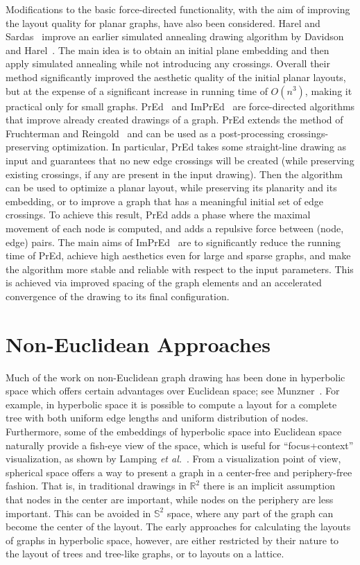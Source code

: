 \documentclass[notitlepage,letter,11pt]{article}
\begin{document}
Modifications to the basic force-directed functionality, with the aim of improving the layout quality for planar graphs, have also been considered. Harel and Sardas~\cite{harel98algorithm} improve an earlier simulated annealing drawing algorithm by Davidson and Harel~\cite{dh-dgnus-96}. The main idea is to obtain an initial plane embedding and then apply simulated annealing while not introducing any crossings. Overall their method significantly improved the aesthetic quality of the initial planar layouts, but at the expense of a significant increase in running time of $O(n^3)$, making it practical only for small graphs.
PrEd~\cite{Bertault-pred-00} and {ImPrEd}~\cite{simonetto-11} are
force-directed algorithms that improve already created drawings of a graph.
PrEd extends the method of Fruchterman and Reingold~\cite{fr-gdfdp-91}
and can be used as a post-processing crossings-preserving
optimization. In particular, PrEd takes some straight-line drawing as
input and guarantees that no new edge crossings will be created (while
preserving existing crossings, if any are present in the input
drawing). Then the algorithm can be used to optimize a planar layout,
while preserving its planarity and its embedding, or to improve a
graph that has a meaningful initial set of edge crossings. To achieve
this result, PrEd adds a phase where the maximal movement of each node
is computed, and adds a repulsive force between (node, edge) pairs. 
The main aims of ImPrEd~\cite{simonetto-11} are to significantly
reduce the running time of PrEd, achieve high aesthetics even for
large and sparse graphs, and make the algorithm more stable and
reliable with respect to the input parameters. This is achieved via
improved spacing of the graph elements and an accelerated convergence
of the drawing to its final configuration.



\section{Non-Euclidean Approaches}
\label{fd:sec:nea}


Much of the work on non-Euclidean graph drawing has been done in
hyperbolic space which offers certain advantages over Euclidean space;
see Munzner~\cite{Munzner+1997a,Munzner:1996:VSW}.  For example, in
hyperbolic space it is possible to compute a layout for a complete
tree with both uniform edge lengths and uniform distribution of nodes.
Furthermore, some of the embeddings of hyperbolic space into Euclidean
space naturally provide a fish-eye view of the space, which is useful
for ``focus+context'' visualization, as shown by Lamping {\em et
al.}~\cite{EVL-1995-206}. From a visualization point of view,
spherical space offers a way to present a graph in a center-free and
periphery-free fashion. That is, in traditional drawings in
$\mathbb{R}^2$ there is an implicit assumption that nodes in the
center are important, while nodes on the periphery are less
important. This can be avoided in $\mathbb{S}^2$ space, where any part
of the graph can become the center of the layout. The early approaches for calculating the
layouts of graphs in hyperbolic space, however, are either restricted
by their nature to the layout of trees and tree-like graphs, or to
layouts on a lattice.
\end{document}

